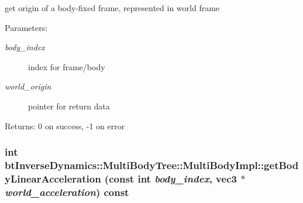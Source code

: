 get origin of a body-fixed frame, represented in world frame \begin{Desc}
\item[Parameters:]
\begin{description}
\item[{\em body\_\-index}]index for frame/body \item[{\em world\_\-origin}]pointer for return data \end{description}
\end{Desc}
\begin{Desc}
\item[Returns:]0 on success, -1 on error \end{Desc}
 \hypertarget{classbt_inverse_dynamics_1_1_multi_body_tree_1_1_multi_body_impl_86e8d45849ab884db42e9fc53fd155ca}{
\subsubsection[getBodyLinearAcceleration]{\setlength{\rightskip}{0pt plus 5cm}int btInverseDynamics::MultiBodyTree::MultiBodyImpl::getBodyLinearAcceleration (const int {\em body\_\-index}, \/  {\bf vec3} $\ast$ {\em world\_\-acceleration}) const}}
\label{classbt_inverse_dynamics_1_1_multi_body_tree_1_1_multi_body_impl_86e8d45849ab884db42e9fc53fd155ca}


